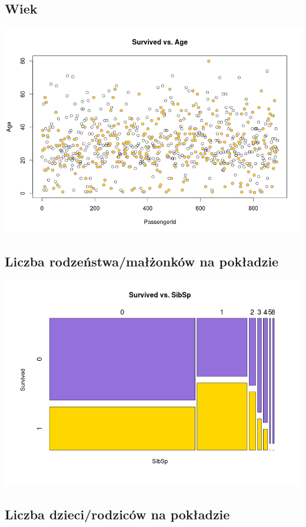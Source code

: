 \documentclass{article}
\begin{document}
\subsection{Wiek}

\includegraphics[scale=0.40]{images/survived-vs-age.png}

\subsection{Liczba rodzeństwa/małżonków na pokładzie}

\includegraphics[scale=0.40]{images/survived-vs-sibsp.png}

\subsection{Liczba dzieci/rodziców na pokładzie}
\end{document}

